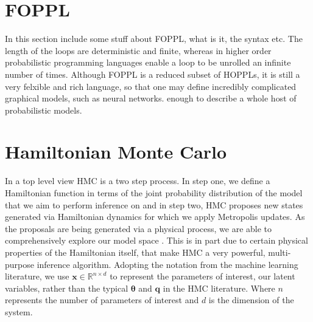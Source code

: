 \documentclass[twoside]{article}
\begin{document}
\section{FOPPL}
\label{sec:foppl}
In this section include some stuff about FOPPL, what is it, the syntax etc.  The length of the loops are deterministic and finite, whereas in higher order probabilistic programming languages enable a loop to be unrolled an infinite number of times. Although FOPPL is a reduced subset of HOPPLs, it is still a very felxible and rich language, so that one may define incredibly complicated graphical models, such as neural networks.  enough to describe a whole host of probabilistic models. 
\section{Hamiltonian Monte Carlo}
\label{sec:hmc}
In a top level view HMC is a two step process. In step one, we define a Hamiltonian function in terms of the joint probability distribution of the model that we aim to perform inference on and in step two, HMC proposes new states generated via Hamiltonian dynamics for which we apply Metropolis updates. As the proposals are being generated via a physical process, we are able to comprehensively explore our model space \citep{neal2011mcmc}. This is in part due to certain physical properties of the Hamiltonian itself, that make HMC a very powerful, multi-purpose inference algorithm. Adopting the notation from the machine learning literature, we use $\textbf{x} \in \mathbb{R}^{n \times d}$ to represent the parameters of interest, our latent variables, rather than the typical $\mathbf{\theta}$ and $\textbf{q}$ in the HMC literature. Where $n$ represents the number of parameters of interest and $d$ is the dimension of the system.
\end{document}
